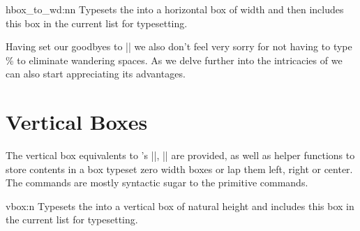 \begin{docCommand}{hbox_to_wd:nn}{  }
   Typesets the  into a horizontal box of width
    and then includes this box in the current list for
   typesetting.
\end{docCommand}


Having set our goodbyes to |\hb@xt@| we also don’t feel very sorry for not having to type \% to eliminate wandering spaces. As we delve further into the intricacies of  we can also start appreciating its advantages.


\section{Vertical Boxes}
The vertical box equivalents to \tex’s |\vbox|, |\vtop| are provided, as well as helper functions to store contents in a box typeset zero width boxes or lap them left, right or center. The commands are mostly syntactic sugar to the primitive commands. 

\begin{docCommand}{vbox:n}{}
Typesets the  into a vertical box of natural height and includes this box in the current list for typesetting.
\end{docCommand}

